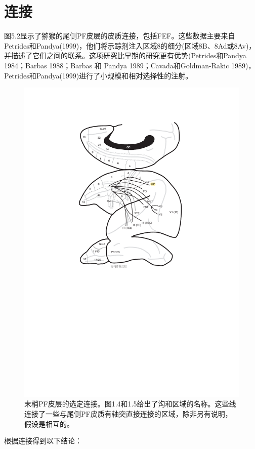 \section{连接}
图5.2显示了猕猴的尾侧PF皮层的皮质连接，包括FEF。这些数据主要来自Petrides和Pandya(1999)，他们将示踪剂注入区域8的细分(区域8B、8Ad或8Av)，并描述了它们之间的联系。这项研究比早期的研究更有优势(Petrides和Pandya 1984；Barbas 1988；Barbas 和 Pandya 1989；Cavada和Goldman-Rakic 1989)， Petrides和Pandya(1999)进行了小规模和相对选择性的注射。
\begin{figure}
	\centering
	\includegraphics[width=0.7\linewidth]{image_pfc/Fig_5_2}
	\caption{末梢PF皮层的选定连接。图1.4和1.5给出了沟和区域的名称。这些线连接了一些与尾侧PF皮质有轴突直接连接的区域，除非另有说明，假设是相互的。}
	\label{fig:fig}
\end{figure}


根据连接得到以下结论：

